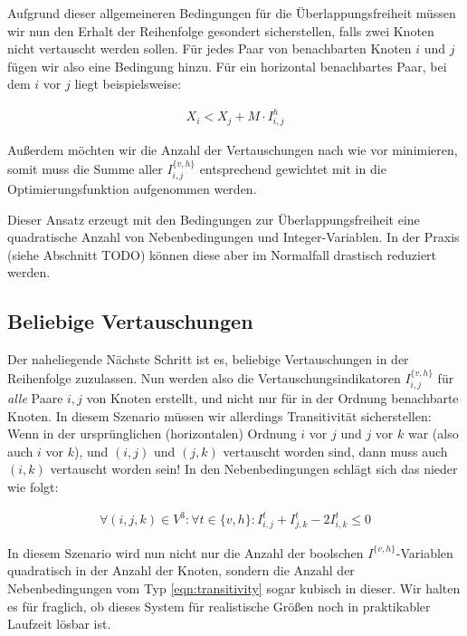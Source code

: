 Aufgrund dieser allgemeineren Bedingungen für die Überlappungsfreiheit müssen wir nun den Erhalt der Reihenfolge gesondert sicherstellen, falls zwei Knoten nicht vertauscht werden sollen. Für jedes Paar von benachbarten Knoten $i$ und $j$ fügen wir also eine Bedingung hinzu. Für ein horizontal benachbartes Paar, bei dem $i$ vor $j$ liegt beispielsweise:

\begin{align}
	X_i < X_j + M \cdot I^{h}_{i,j}
\end{align}

Außerdem möchten wir die Anzahl der Vertauschungen nach wie vor minimieren, somit muss die Summe aller $I^{\{v,h\}}_{i,j}$ entsprechend gewichtet mit in die Optimierungsfunktion aufgenommen werden.

Dieser Ansatz erzeugt mit den Bedingungen zur Überlappungsfreiheit eine quadratische Anzahl von Nebenbedingungen und Integer-Variablen. In der Praxis (siehe Abschnitt TODO) können diese aber im Normalfall drastisch reduziert werden.

\subsection{Beliebige Vertauschungen}

Der naheliegende Nächste Schritt ist es, beliebige Vertauschungen in der Reihenfolge zuzulassen. Nun werden also die Vertauschungsindikatoren $I^{\{v,h\}}_{i,j}$ für \textit{alle} Paare $i,j$ von Knoten erstellt, und nicht nur für in der Ordnung benachbarte Knoten. In diesem Szenario müssen wir allerdings Transitivität sicherstellen: Wenn in der ursprünglichen (horizontalen) Ordnung $i$ vor $j$ und $j$ vor $k$ war (also auch $i$ vor $k$), und $(i,j)$ und $(j,k)$ vertauscht worden sind, dann muss auch $(i,k)$ vertauscht worden sein! In den Nebenbedingungen schlägt sich das nieder wie folgt:

\begin{align}
	\forall (i,j,k) \in V^3 : \forall t \in \{v,h\} :  I^{t}_{i,j} + I^{t}_{j,k} - 2 I^{t}_{i,k} \leq 0 \label{eqn:transitivity}
\end{align}

In diesem Szenario wird nun nicht nur die Anzahl der boolschen $I^{\{v,h\}}$-Variablen quadratisch in der Anzahl der Knoten, sondern die Anzahl der Nebenbedingungen vom Typ \ref{eqn:transitivity} sogar kubisch in dieser. Wir halten es für fraglich, ob dieses System für realistische Größen noch in praktikabler Laufzeit lösbar ist.

